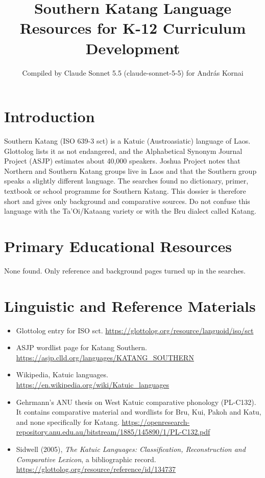 \documentclass[12pt]{article}
\title{Southern Katang Language Resources for K-12 Curriculum Development}
\author{Compiled by Claude Sonnet 5.5 (claude-sonnet-5-5) for Andr\'as Kornai}
\date{}
\begin{document}
\maketitle

\section{Introduction}
Southern Katang (ISO 639-3 sct) is a Katuic (Austroasiatic) language of Laos. Glottolog lists it as not endangered, and the Alphabetical Synonym Journal Project (ASJP) estimates about 40,000 speakers. Joshua Project notes that Northern and Southern Katang groups live in Laos and that the Southern group speaks a slightly different language. The searches found no dictionary, primer, textbook or school programme for Southern Katang. This dossier is therefore short and gives only background and comparative sources. Do not confuse this language with the Ta'Oi/Kataang variety or with the Bru dialect called Katang.

\section{Primary Educational Resources}
None found. Only reference and background pages turned up in the searches.

\section{Linguistic and Reference Materials}
\begin{itemize}
\item Glottolog entry for ISO sct. \url{https://glottolog.org/resource/languoid/iso/sct}
\item ASJP wordlist page for Katang Southern. \url{https://asjp.clld.org/languages/KATANG_SOUTHERN}
\item Wikipedia, Katuic languages. \url{https://en.wikipedia.org/wiki/Katuic_languages}
\item Gehrmann's ANU thesis on West Katuic comparative phonology (PL-C132). It contains comparative material and wordlists for Bru, Kui, Pakoh and Katu, and none specifically for Katang. \url{https://openresearch-repository.anu.edu.au/bitstream/1885/145890/1/PL-C132.pdf}
\item Sidwell (2005), \emph{The Katuic Languages: Classification, Reconstruction and Comparative Lexicon}, a bibliographic record. \url{https://glottolog.org/resource/reference/id/134737}
\end{itemize}
\end{document}

